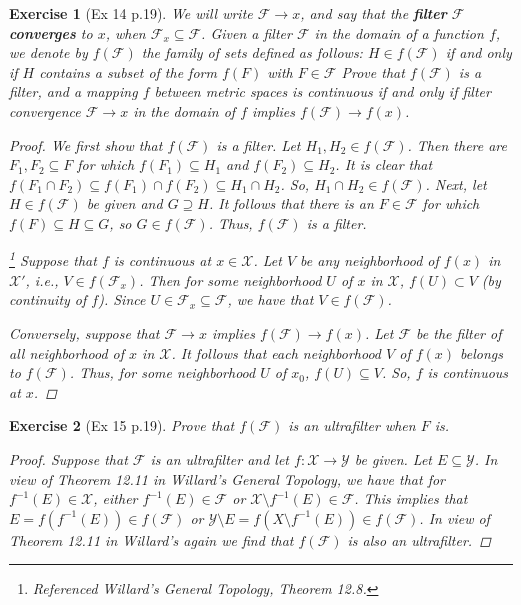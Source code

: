 \documentclass[11pt]{article}
\newtheorem{exercise}{Exercise}
\begin{document}
\begin{exercise}[Ex 14 p.19]
	We will write $\mathcal{F} \to x$, and say that the \textbf{filter} $\mathcal{F}$ \textbf{converges} to $x$, when $\mathcal{F}_x \subseteq \mathcal{F}$. Given a filter $\mathcal{F}$ in the domain of a function $f$, we denote by $f(\mathcal{F})$ the
	family of sets defined as follows: $H \in f(\mathcal{F})$ if and only if $H$ contains a subset
	of the form $f(F)$ with $F \in \mathcal{F}$ Prove that $f(\mathcal{F})$ is a filter, and a mapping $f$
	between metric spaces is continuous if and only if filter convergence $\mathcal{F} \to x$ in the domain of $f$ implies $f(\mathcal{F}) \to f(x)$.
	\begin{proof}
		We first show that $f(\mathcal{F})$ is a filter. Let $H_1, H_2 \in f(\mathcal{F})$. Then there are $F_1,F_2\subseteq F$ for which $f(F_1) \subseteq H_1$ and $f(F_2)\subseteq H_2$. It is clear that $f(F_1 \cap F_2) \subseteq f(F_1) \cap f(F_2) \subseteq H_1 \cap H_2$. So, $H_1 \cap H_2 \in f(\mathcal{F})$. Next, let $H \in f(\mathcal{F})$ be given and $G \supseteq H$. It follows that there is an $F\in \mathcal{F}$ for which $f(F)\subseteq H \subseteq G$, so $G\in f(\mathcal{F})$. Thus, $f(\mathcal{F})$ is a filter. 
		
		\footnote{Referenced Willard's \textit{General Topology}, Theorem 12.8.} Suppose that $f$ is continuous at $x\in \mathcal{X}$. Let $V$ be any neighborhood of $f(x)$ in $\mathcal{X}'$, i.e.,  $V\in f(\mathcal{F}_x)$. Then for some neighborhood $U$ of $x$ in $\mathcal{X}$, $f(U) \subset V$ (by continuity of $f$). Since $U\in \mathcal{F}_x \subseteq \mathcal{F}$, we have that $V\in f(\mathcal{F})$.
		
		Conversely, suppose that $\mathcal{F} \to x$ implies $f(\mathcal{F}) \to f(x)$. Let $\mathcal{F}$ be the filter of all neighborhood of $x$ in $\mathcal{X}$. It follows that each neighborhood $V$ of $f(x)$ belongs to $f(\mathcal{F})$. Thus, for some neighborhood $U$ of $x_0$, $f(U)\subseteq V$. So, $f$ is continuous at $x$.  
		
		 
	\end{proof}
\end{exercise}

\begin{exercise}[Ex 15 p.19]
	Prove that $f(\mathcal{F})$ is an ultrafilter when $F$ is.
	\begin{proof}
		Suppose that $\mathcal{F}$ is an ultrafilter and let $f:\mathcal{X}\to \mathcal{Y}$ be given. Let $E\subseteq \mathcal{Y}$. In view of Theorem 12.11 in Willard's \textit{General Topology}, we have that for $f^{-1}(E)\in \mathcal{X}$, either $f^{-1}(E)\in \mathcal{F}$ or $\mathcal{X}\setminus f^{-1}(E) \in \mathcal{F}$. This implies that $E = f(f^{-1}(E)) \in f(\mathcal{F})$ or $\mathcal{Y}\setminus E = f(X\setminus f^{-1}(E)) \in f(\mathcal{F})$. In view of Theorem 12.11 in Willard's again we find that $f(\mathcal{F})$ is also an ultrafilter. 
	\end{proof}
\end{exercise}
\end{document}
